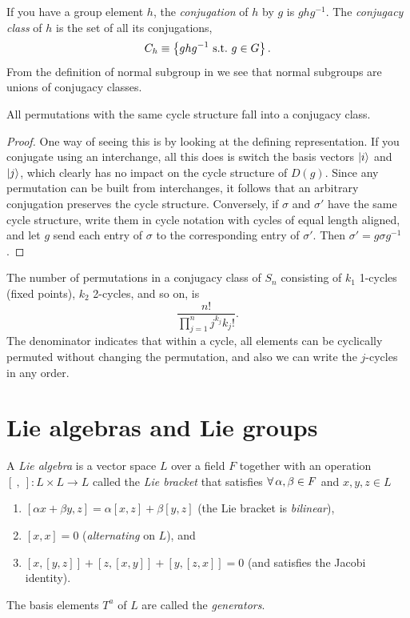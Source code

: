 If you have a group element $h$, the
{\it conjugation} of $h$ by $g$ is $ghg^{-1}$.
The {\it conjugacy class} of $h$ is the set of all
its conjugations,
\begin{equation}
C_h\equiv\left\{ghg^{-1}~\text{s.t.}~ g\in G\right\}.
\end{equation}
From the definition of normal subgroup in  we
see that normal subgroups are unions of conjugacy classes.

\begin{proposition}{}{}
All permutations with the same cycle structure fall into a conjugacy class.
\begin{proof}
One way of seeing this
is by looking at the defining representation. If you conjugate using
an interchange, all this does is switch the basis vectors
$\ket{i}$ and $\ket{j}$, which clearly has no impact on the cycle
structure of $D(g)$. Since any permutation can be built from interchanges,
it follows that an arbitrary conjugation preserves the cycle
structure. Conversely, if $\sigma$ and $\sigma'$ have the same cycle
structure, write them in cycle notation with cycles of equal length
aligned, and let $g$ send each entry of $\sigma$ to the corresponding
entry of $\sigma'$. Then $\sigma'=g\sigma g^{-1}$.
\end{proof}
\end{proposition}

The number of permutations in a conjugacy class of $S_n$ consisting
of $k_1$ 1-cycles (fixed points), $k_2$ 2-cycles, and so on, is
\begin{equation}
\frac{n!}{\prod_{j=1}^n j^{k_j}k_j!}.
\end{equation}
The denominator indicates that within a cycle, all elements can be cyclically
permuted without changing the permutation, and also we can write the $j$-cycles
in any order. 


\section{Lie algebras and Lie groups}

  A {\it Lie algebra} is a vector space $L$ over a field $F$
  together with an operation $[\ ,\ ]:L\times L\to L$ called the 
  {\it Lie bracket} that satisfies 
  $\operatorname{\forall} \alpha,\beta\in F$ 
  and $x,y,z\in L$
  \begin{enumerate}
    \item $[\alpha x+\beta y,z]=\alpha[x,z]+\beta[y,z]$ (the Lie bracket is 
          {\it bilinear}),
    \item $[x,x]=0$ ({\it alternating} on $L$), and
    \item $[x,[y,z]]+[z,[x,y]]+[y,[z,x]]=0$ (and satisfies the Jacobi
          identity).
  \end{enumerate}
  The basis elements $T^a$ of $L$ are called the {\it generators}.

